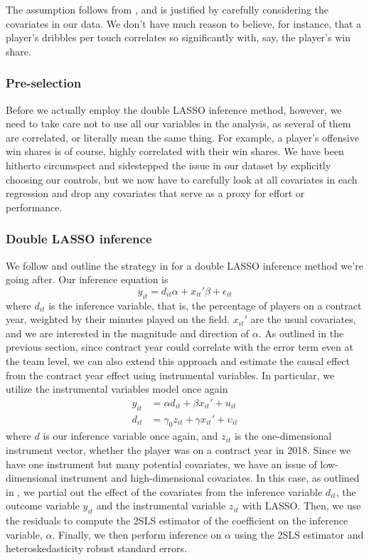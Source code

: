 \documentclass[12pt]{article}
\begin{document}
	The assumption follows from \cite{belloni_high-dimensional_2014}, and is justified by carefully considering the covariates in our data. We don't have much reason to believe, for instance, that a player's dribbles per touch correlates so significantly with, say, the player's win share.
	
	\subsubsection{Pre-selection}
	
	Before we actually employ the double LASSO inference method, however, we need to take care not to use all our variables in the analysis, as several of them are correlated, or literally mean the same thing. For example, a player's offensive win shares is of course, highly correlated with their win shares. We have been hitherto circumspect and sidestepped the issue in our dataset by explicitly choosing our controls, but we now have to carefully look at all covariates in each regression and drop any covariates that serve as a proxy for effort or performance.
	
	\subsubsection{Double LASSO inference}
	
	We follow and outline the strategy in \cite{chernozhukov_high-dimensional_2016-1} for a double LASSO inference method we're going after. Our inference equation is \[
	y_{it} = d_{it} \alpha + x_{it}'\beta + \epsilon_{it}
	\] where $d_{it}$ is the inference variable, that is, the percentage of players on a contract year, weighted by their minutes played on the field. $x_{it}'$ are the usual covariates, and we are interested in the magnitude and direction of $\alpha$. As outlined in the previous section, since contract year could correlate with the error term even at the team level, we can also extend this approach and estimate the causal effect from the contract year effect using instrumental variables. In particular, we utilize the instrumental variables model once again \[
	\begin{aligned}
	y_{it} &= \alpha d_{it} + \beta x_{it}' + u_{it} \\
	d_{it} &= \gamma_0 z_{it} + \gamma x_{it}' + \upsilon_{it}
	\end{aligned}
	\] where $d$ is our inference variable once again, and $z_{it}$ is the one-dimensional instrument vector, whether the player was on a contract year in 2018. Since we have one instrument but many potential covariates, we have an issue of low-dimensional instrument and high-dimensional covariates. In this case, as outlined in \cite{chernozhukov_high-dimensional_2016-1}, we partial out the effect of the covariates from the inference variable $d_{it}$, the outcome variable $y_{it}$ and the instrumental variable $z_{it}$ with LASSO. Then, we use the residuals to compute the 2SLS estimator of the coefficient on the inference variable, $\alpha$. Finally, we then perform inference on $\alpha$ using the 2SLS estimator and heteroskedasticity robust standard errors.
	
\end{document}
